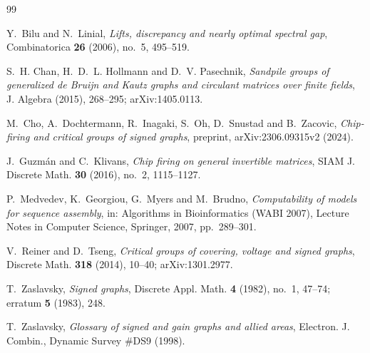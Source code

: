 \documentclass[11pt]{article}
\theoremstyle{plain}
\theoremstyle{definition}
\theoremstyle{remark}
\begin{document}
\begin{thebibliography}{99}

 Y.~Bilu and N.~Linial,
\emph{Lifts, discrepancy and nearly optimal spectral gap},
Combinatorica \textbf{26} (2006), no.~5, 495--519.

 S.~H. Chan, H.~D.~L. Hollmann and D.~V. Pasechnik,
\emph{Sandpile groups of generalized de Bruijn and Kautz graphs and circulant matrices over
finite fields}, J. Algebra (2015), 268--295; arXiv:1405.0113.

 M.~Cho, A.~Dochtermann, R.~Inagaki, S.~Oh, D.~Snustad and B.~Zacovic,
\emph{Chip-firing and critical groups of signed graphs}, preprint, arXiv:2306.09315v2 (2024).

 J.~Guzm\'an and C.~Klivans,
\emph{Chip firing on general invertible matrices},
SIAM J. Discrete Math. \textbf{30} (2016), no.~2, 1115--1127.

 P.~Medvedev, K.~Georgiou, G.~Myers and M.~Brudno,
\emph{Computability of models for sequence assembly},
in: Algorithms in Bioinformatics (WABI 2007), Lecture Notes in Computer Science, Springer,
2007, pp.~289--301.

 V.~Reiner and D.~Tseng,
\emph{Critical groups of covering, voltage and signed graphs},
Discrete Math. \textbf{318} (2014), 10--40; arXiv:1301.2977.

 T.~Zaslavsky, \emph{Signed graphs},
Discrete Appl. Math. \textbf{4} (1982), no.~1, 47--74; erratum \textbf{5} (1983), 248.

 T.~Zaslavsky,
\emph{Glossary of signed and gain graphs and allied areas},
Electron. J. Combin., Dynamic Survey \#DS9 (1998).

\end{thebibliography}
\end{document}
